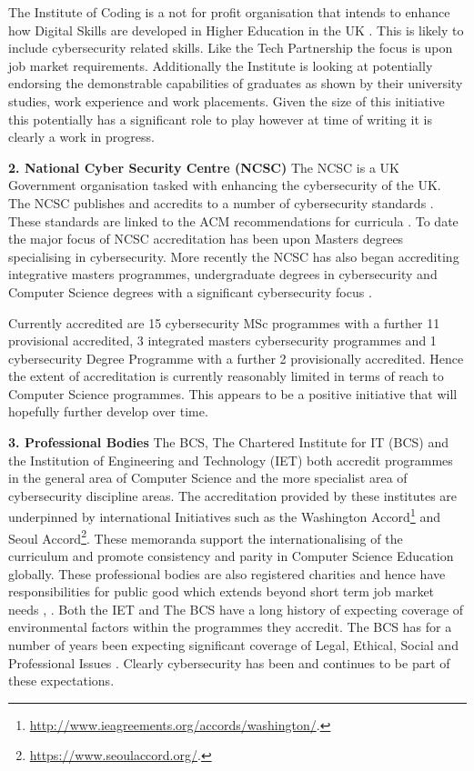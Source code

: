 \documentclass[conference]{IEEEtran}
\begin{document}
The Institute of Coding is a not for profit organisation that intends to enhance how Digital Skills are developed in Higher Education in the UK \cite{Davenportetal2019a}. This is likely to include cybersecurity related skills. Like the Tech Partnership the focus is upon job market requirements. Additionally the Institute is looking at potentially endorsing the demonstrable capabilities of graduates as shown by their university studies, work experience and work placements. Given the size of this initiative this potentially has a significant role to play however at time of writing it is clearly a work in progress.

\textbf{2. National Cyber Security Centre (NCSC)}
The NCSC is a UK Government organisation tasked with enhancing the cybersecurity of the UK. The NCSC publishes and accredits to a number of cybersecurity standards \cite{NCSC2018a}. These standards are linked to the ACM recommendations for curricula \cite{ACM2013a}. To date the major focus of NCSC accreditation has been upon Masters degrees specialising in cybersecurity. More recently the NCSC has also began accrediting integrative masters programmes, undergraduate degrees in cybersecurity and Computer Science degrees with a significant cybersecurity focus \cite{NCSC2018b}.

Currently accredited are 15 cybersecurity MSc programmes with a further 11 provisional accredited, 3 integrated masters cybersecurity programmes and 1 cybersecurity Degree Programme with a further 2 provisionally accredited. Hence the extent of accreditation is currently reasonably limited in terms of reach to Computer Science programmes. This appears to be a positive initiative that will hopefully further develop over time. 

\textbf{3. Professional Bodies}
The BCS, The Chartered Institute for IT (BCS) and the Institution of Engineering and Technology (IET) both accredit programmes in the general area of Computer Science and the more specialist area of cybersecurity discipline areas. The accreditation provided by these institutes are underpinned by international Initiatives such as the Washington Accord\footnote{\url{http://www.ieagreements.org/accords/washington/}.} and Seoul Accord\footnote{\url{https://www.seoulaccord.org/}.}. These memoranda support the internationalising of the curriculum and promote consistency and parity in Computer Science Education globally.   These professional bodies are also registered charities and hence have responsibilities for public good which extends beyond short term job market needs \cite{Stensaker2006}, \cite{Mutereko2017}. Both the IET and The BCS have a long history of expecting coverage of environmental factors within the programmes they accredit. The BCS has for a number of years been expecting significant coverage of Legal, Ethical, Social and Professional Issues \cite{Brooke2018}. Clearly cybersecurity has been and continues to be part of these expectations. 
\end{document}

